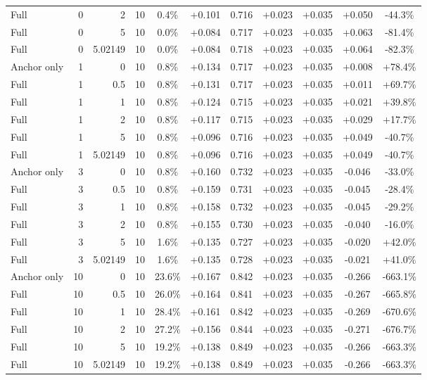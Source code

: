 \begin{table}[htbp]
\begin{tabular}{lrrrccccccc}
Full & 0 & 2 & 10 & 0.4\% & +0.101 & 0.716 & +0.023 & +0.035 & +0.050 & -44.3\% \\
Full & 0 & 5 & 10 & 0.0\% & +0.084 & 0.717 & +0.023 & +0.035 & +0.063 & -81.4\% \\
Full & 0 & 5.02149 & 10 & 0.0\% & +0.084 & 0.718 & +0.023 & +0.035 & +0.064 & -82.3\% \\
Anchor only & 1 & 0 & 10 & 0.8\% & +0.134 & 0.717 & +0.023 & +0.035 & +0.008 & +78.4\% \\
Full & 1 & 0.5 & 10 & 0.8\% & +0.131 & 0.717 & +0.023 & +0.035 & +0.011 & +69.7\% \\
Full & 1 & 1 & 10 & 0.8\% & +0.124 & 0.715 & +0.023 & +0.035 & +0.021 & +39.8\% \\
Full & 1 & 2 & 10 & 0.8\% & +0.117 & 0.715 & +0.023 & +0.035 & +0.029 & +17.7\% \\
Full & 1 & 5 & 10 & 0.8\% & +0.096 & 0.716 & +0.023 & +0.035 & +0.049 & -40.7\% \\
Full & 1 & 5.02149 & 10 & 0.8\% & +0.096 & 0.716 & +0.023 & +0.035 & +0.049 & -40.7\% \\
Anchor only & 3 & 0 & 10 & 0.8\% & +0.160 & 0.732 & +0.023 & +0.035 & -0.046 & -33.0\% \\
Full & 3 & 0.5 & 10 & 0.8\% & +0.159 & 0.731 & +0.023 & +0.035 & -0.045 & -28.4\% \\
Full & 3 & 1 & 10 & 0.8\% & +0.158 & 0.732 & +0.023 & +0.035 & -0.045 & -29.2\% \\
Full & 3 & 2 & 10 & 0.8\% & +0.155 & 0.730 & +0.023 & +0.035 & -0.040 & -16.0\% \\
Full & 3 & 5 & 10 & 1.6\% & +0.135 & 0.727 & +0.023 & +0.035 & -0.020 & +42.0\% \\
Full & 3 & 5.02149 & 10 & 1.6\% & +0.135 & 0.728 & +0.023 & +0.035 & -0.021 & +41.0\% \\
Anchor only & 10 & 0 & 10 & 23.6\% & +0.167 & 0.842 & +0.023 & +0.035 & -0.266 & -663.1\% \\
Full & 10 & 0.5 & 10 & 26.0\% & +0.164 & 0.841 & +0.023 & +0.035 & -0.267 & -665.8\% \\
Full & 10 & 1 & 10 & 28.4\% & +0.161 & 0.842 & +0.023 & +0.035 & -0.269 & -670.6\% \\
Full & 10 & 2 & 10 & 27.2\% & +0.156 & 0.844 & +0.023 & +0.035 & -0.271 & -676.7\% \\
Full & 10 & 5 & 10 & 19.2\% & +0.138 & 0.849 & +0.023 & +0.035 & -0.266 & -663.3\% \\
Full & 10 & 5.02149 & 10 & 19.2\% & +0.138 & 0.849 & +0.023 & +0.035 & -0.266 & -663.3\% \\

\end{tabular}
\end{table}
